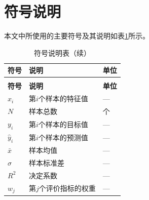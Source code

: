 
\section{符号说明}

本文中所使用的主要符号及其说明如表\ref{tab:symbols}所示。

\begin{longtable}{>{\centering\arraybackslash}p{}>{\centering\arraybackslash}p{}>{\centering\arraybackslash}p{}}
  \caption{符号说明表}
  \label{tab:symbols} \\
  \toprule
  \textbf{符号} & \textbf{说明} & \textbf{单位} \\
  \midrule
  \endfirsthead
  \caption{符号说明表（续）} \\
  \toprule
  \textbf{符号} & \textbf{说明} & \textbf{单位} \\
  \midrule
  \endhead
  \bottomrule
  \endfoot
  $x_i$ & 第$i$个样本的特征值 & — \\
  $N$ & 样本总数 & 个 \\
  $y_i$ & 第$i$个样本的目标值 & — \\
  $\hat{y}_i$ & 第$i$个样本的预测值 & — \\
  $\bar{x}$ & 样本均值 & — \\
  $\sigma$ & 样本标准差 & — \\
  $R^2$ & 决定系数 & — \\
  $w_j$ & 第$j$个评价指标的权重 & — \\
\end{longtable}
